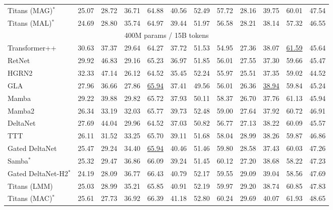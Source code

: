 \documentclass{article}
\begin{document}
\begin{table}[t!]
{\begin{tabular}{l|c c|c c c c c c c c c}
Titans (MAG)$^*$         & 25.07 & 28.72 & \cellcolor{mygreen}36.71 & 64.88 & \cellcolor{mygreen}40.56 & \cellcolor{mygreen}52.49 & 57.72& 28.16 & \cellcolor{mygreen}39.75 & 60.01& \cellcolor{mygreen}47.54 \\
Titans (MAL)$^*$         & \cellcolor{mygreen}24.69 & 28.80 & 35.74  & 64.97 & 39.44 & 51.97 & 56.58  & 28.21 & 38.14 & 57.32 & 46.55\\
\midrule
\multicolumn{12}{c}{400M params / 15B tokens} \\
\midrule
 Transformer++ & 30.63 & 37.37 & 29.64 & 64.27 & 37.72 &	51.53 & 54.95	& 27.36 &  38.07  &  \cellcolor{myblue}\underline{61.59}  & 45.64 \\
 RetNet & 29.92 & 46.83 & 29.16 & 65.23 & 36.97 &	51.85 & 56.01	& 27.55 &  37.30  & 59.66  & 45.47 \\
 HGRN2 & 32.33 & 47.14 & 26.12 & 64.52 & 35.45 &	52.24 & 55.97	& 25.51 &  37.35  & 59.02  & 44.52 \\
GLA & 27.96 & 36.66 & 27.86 &  \cellcolor{myblue}\underline{65.94} & 37.41 &	49.56 & 56.01	& 26.36 &   \cellcolor{myblue}\underline{38.94}  & 59.84  & 45.24 \\
 Mamba & 29.22 & 39.88 & 29.82 & 65.72 & 37.93 &	50.11 & 58.37	& 26.70 &  37.76  & 61.13  & 45.94 \\
Mamba2 & 26.34 & 33.19 & 32.03 & 65.77 & 39.73 &	{52.48} & 59.00	& 27.64 &  37.92  & 60.72  & 46.91 \\
 DeltaNet & 27.69 & 44.04 & 29.96 & 64.52 & 37.03 &	50.82 & 56.77	& 27.13 &  38.22  & 60.09  & 45.57 \\
 TTT & 26.11 & 31.52 & 33.25 & 65.70 & 39.11 & 51.68& 58.04& 28.99 & 38.26 & 59.87 & 46.86\\
Gated DeltaNet & 25.47 & 29.24 & 34.40 &  \cellcolor{myblue}\underline{65.94} & 40.46 &	51.46 & {59.80}	& {28.58} &  37.43  & 60.03  & 47.26 \\
 Samba$^*$ & 25.32 & 29.47 & 36.86 & 66.09& 39.24 & 51.45 & 60.12 & 27.20  & 38.68  &  58.22 & 47.23\\
Gated DeltaNet-H2$^*$  & {24.19} & {28.09} & {36.77} & {66.43} & {40.79} &	{52.17} & 59.55	& {29.09} &  {39.04}  & 58.56  & {47.69} \\
\midrule
Titans (LMM) & \cellcolor{myblue}25.03 & \cellcolor{myblue} 28.99  & \cellcolor{myblue}35.21 & 65.85 & \cellcolor{myblue}40.91 & \cellcolor{myblue}52.19 & \cellcolor{myblue} 59.97 & \cellcolor{myblue}29.20 & 38.74 & 60.85 &  \cellcolor{myblue}47.83  \\
Titans (MAC)$^*$         & 25.61 & \cellcolor{mygreen}27.73  &     36.92 & 66.39 & \cellcolor{mygreen}41.18 & 52.80 & \cellcolor{mygreen}60.24 & 29.69 & \cellcolor{mygreen}40.07  & \cellcolor{mygreen}61.93 & \cellcolor{mygreen}48.65 \\

\end{tabular}}
\end{table}
\end{document}
